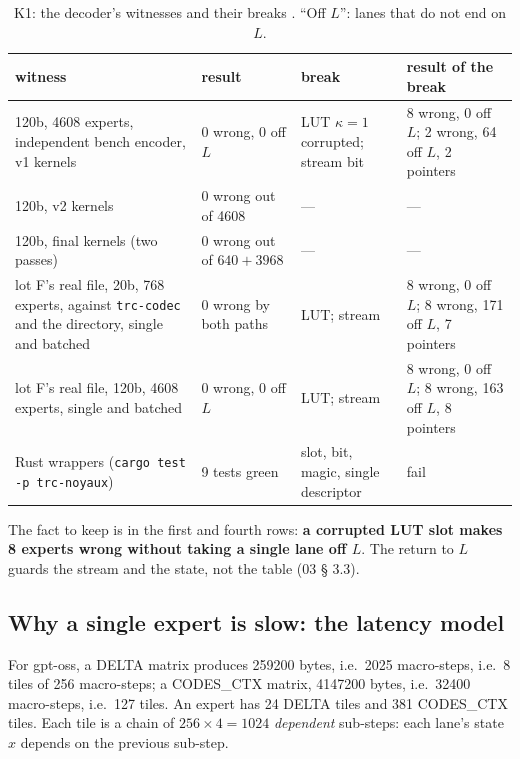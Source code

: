 \begin{table}[!htbp]
\centering\small
\caption[K1: witnesses and breaks]{K1: the decoder's witnesses and their breaks \mes. ``Off $L$'': lanes that do not end on $L$.}
\label{tab:t2n-temoins-k1}
\begin{tabularx}{\linewidth}{@{}p{4.4cm}p{2.5cm}p{2.9cm}X@{}}
\toprule
witness & result & break & result of the break \\
\midrule
120b, \num{4608} experts, independent bench encoder, v1 kernels & 0 wrong, 0 off $L$ & LUT $\kappa = 1$ corrupted; stream bit & 8 wrong, 0 off $L$; 2 wrong, 64 off $L$, 2 pointers \\
120b, v2 kernels & 0 wrong out of \num{4608} & — & — \\
120b, final kernels (two passes) & 0 wrong out of $640 + \num{3968}$ & — & — \\
lot F's real file, 20b, 768 experts, against \texttt{trc-codec} and the directory, single and batched & 0 wrong by both paths & LUT; stream & 8 wrong, 0 off $L$; 8 wrong, 171 off $L$, 7 pointers \\
lot F's real file, 120b, \num{4608} experts, single and batched & 0 wrong, 0 off $L$ & LUT; stream & 8 wrong, 0 off $L$; 8 wrong, 163 off $L$, 8 pointers \\
Rust wrappers (\texttt{cargo test -p trc-noyaux}) & 9 tests green & slot, bit, magic, single descriptor & fail \\
\bottomrule
\end{tabularx}
\end{table}

The fact to keep is in the first and fourth rows: \textbf{a corrupted LUT slot makes 8 experts wrong without taking a single lane off $L$}. The return to $L$ guards the stream and the state, not the table (03 § 3.3).

\subsection{Why a single expert is slow: the latency model}

For gpt-oss, a DELTA matrix produces \num{259200} bytes, i.e.\ \num{2025} macro-steps, i.e.\ 8 tiles of 256 macro-steps; a CODES\_CTX matrix, \num{4147200} bytes, i.e.\ \num{32400} macro-steps, i.e.\ 127 tiles. An expert has 24 DELTA tiles and 381 CODES\_CTX tiles. Each tile is a chain of $256 \times 4 = \num{1024}$ \emph{dependent} sub-steps: each lane's state $x$ depends on the previous sub-step.

